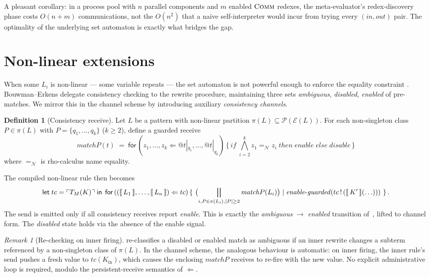 \documentclass[11pt]{article}
\theoremstyle{plain}
\theoremstyle{definition}
\newtheorem{definition}[theorem]{Definition}
\theoremstyle{remark}
\newtheorem{remark}[theorem]{Remark}
\newcommand{\sem}[1]{\llbracket\,#1\,\rrbracket}
\newcommand{\reflect}[1]{\ulcorner #1 \urcorner}
\newcommand{\edges}{\mathcal{E}}
\newcommand{\Match}{\mathit{match}}
\newcommand{\Send}[2]{#1 \,!\, (#2)}
\newcommand{\Recv}[3]{\mathsf{for}\,(#1 \Leftarrow #2)\,\{\,#3\,\}}
\newcommand{\Let}[3]{\mathsf{let}\;#1 = #2\;\mathsf{in}\;#3}
\begin{document}
A pleasant corollary: in a process pool with $n$ parallel components and
$m$ enabled $\textsc{Comm}$ redexes, the meta-evaluator's redex-discovery
phase costs $O(n + m)$ communications, not the $O(n^{2})$ that a naive
self-interpreter would incur from trying every $(\mathit{in},
\mathit{out})$ pair. The optimality of the underlying set automaton is
exactly what bridges the gap.

\section{Non-linear extensions}\label{sec:nonlinear}

When some $L_{i}$ is non-linear --- some variable repeats --- the set
automaton is not powerful enough to enforce the equality constraint
\cite[\S 6]{BouwmanErkens2022,Comon2007}. Bouwman--Erkens delegate
consistency checking to the rewrite procedure, maintaining three sets
\textit{ambiguous}, \textit{disabled}, \textit{enabled} of pre-matches.
We mirror this in the channel scheme by introducing
auxiliary \emph{consistency channels}.

\begin{definition}[Consistency receive]\label{def:consistency}
Let $L$ be a pattern with non-linear partition $\pi(L) \subseteq
\mathcal{P}(\edges(L))$. For each non-singleton class $P \in \pi(L)$ with
$P = \{q_{1}, \ldots, q_{k}\}$ ($k \ge 2$), define a guarded receive
\[
  \Match{P}(t) \;=\;
  \mathsf{for}\,(z_{1}, \ldots, z_{k} \Leftarrow @t|_{q_{1}}, \ldots, @t|_{q_{k}})\,\{\,
    \mathit{if}\;\bigwedge_{i=2}^{k} z_{1} =_{\mathcal{N}} z_{i}\;\mathit{then}\;\mathit{enable}\;\mathit{else}\;\mathit{disable}\,
  \}
\]
where $=_{\mathcal{N}}$ is rho-calculus name equality.
\end{definition}

The compiled non-linear rule then becomes
\[
  \Let{tc}{\reflect{T_{M}(K)}}{\,
    \Recv{(\sem{L_{1}}, \ldots, \sem{L_{n}})}{tc}{\,
      \bigl(\bigparallel_{i, P \in \pi(L_{i}), |P| \ge 2} \Match{P}(L_{i})\bigr)
      \mid \mathit{enable\text{-}guarded}(\Send{tc}{\sem{K'}(\ldots)})\,}
  \,}.
\]
The send is emitted only if all consistency receives report \emph{enable}.
This is exactly the \textit{ambiguous} $\to$ \textit{enabled} transition
of~\cite[Algorithm~2, lines 12--17]{BouwmanErkens2022}, lifted to channel
form. The \textit{disabled} state holds via the absence of the enable
signal.

\begin{remark}[Re-checking on inner firing]\label{rem:recheck}
\cite[Algorithm~2, lines 24--31]{BouwmanErkens2022} re-classifies a
disabled or enabled match as ambiguous if an inner rewrite changes a
subterm referenced by a non-singleton class of $\pi(L)$. In the channel
scheme, the analogous behaviour is automatic: on inner firing, the inner
rule's send pushes a fresh value to $tc(K_{\mathrm{in}})$, which causes
the enclosing $\Match{P}$ receives to re-fire with the new value. No
explicit administrative loop is required, modulo the persistent-receive
semantics of $\Leftarrow$.
\end{remark}
\end{document}
